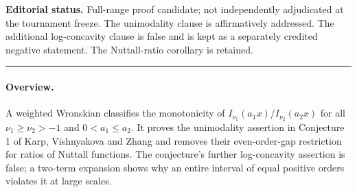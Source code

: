 \documentclass[11pt,a4paper]{article}
\begin{document}
\noindent\textbf{Editorial status.} Full-range proof candidate; not independently adjudicated at the tournament freeze. The unimodality clause is affirmatively addressed. The additional log-concavity clause is false and is kept as a separately credited negative statement. The Nuttall-ratio corollary is retained.

\smallskip\hrule\medskip



\begingroup

\setcounter{equation}{0}
\renewcommand{\theequation}{\thesection.\arabic{equation}}
\renewcommand{\theHequation}{R24Hb.\arabic{equation}}
\paragraph{Overview.}
A weighted Wronskian classifies the monotonicity of
$I_{\nu_1}(a_1x)/I_{\nu_2}(a_2x)$ for all $\nu_1\ge\nu_2>-1$ and
$0<a_1\le a_2$. It proves the unimodality assertion in Conjecture 1 of
Karp, Vishnyakova and Zhang and removes their even-order-gap
restriction for ratios of Nuttall functions. The conjecture's further
log-concavity assertion is false; a two-term expansion shows why an
entire interval of equal positive orders violates it at large scales.
\end{document}
